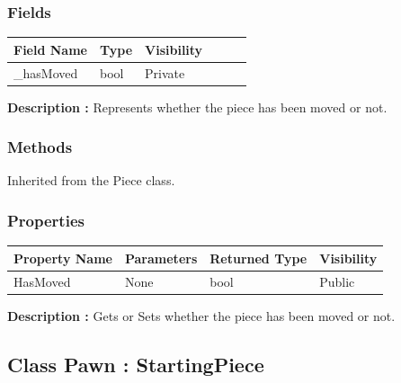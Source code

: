 \documentclass[12pt]{article}
\begin{document}
    \subsubsection{Fields}

    \begin{table}[H]
        \begin{tabular}{llllll}
            \hline
            \multicolumn{1}{|l|}{\cellcolor[HTML]{EFEFEF}\textbf{Field Name}} & \multicolumn{1}{l|}{\cellcolor[HTML]{EFEFEF}\textbf{Type}} & \multicolumn{1}{l|}{\cellcolor[HTML]{EFEFEF}\textbf{Visibility}} \\ \hline
            \multicolumn{1}{|l|}{\_hasMoved}                                  & \multicolumn{1}{l|}{bool}                                  & \multicolumn{1}{l|}{Private}                                     \\ \hline
        \end{tabular}
    \end{table}

    \textbf{Description :} Represents whether the piece has been moved or not.

    \subsubsection{Methods}
    Inherited from the Piece class.

    \subsubsection{Properties}

    \begin{table}[H]
        \begin{tabular}{|l|l|l|l|}
            \hline
            \rowcolor[HTML]{EFEFEF}
            \cellcolor[HTML]{EFEFEF}\textbf{Property Name} & \textbf{Parameters} & \textbf{Returned Type} & \textbf{Visibility} \\ \hline
            HasMoved                                       & None                & bool                   & Public              \\ \hline
        \end{tabular}
    \end{table}

    \textbf{Description :} Gets or Sets whether the piece has been moved or not.
    \newpage


    \subsection{Class Pawn : StartingPiece}
\end{document}
